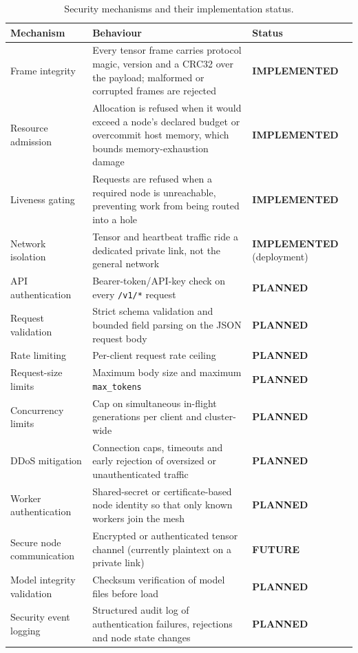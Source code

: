 \documentclass[11pt,a4paper]{article}
\newcommand{\stImp}{\textcolor{ogreen}{\footnotesize\textsf{\textbf{IMPLEMENTED}}}}
\newcommand{\stPlan}{\textcolor{oblue}{\footnotesize\textsf{\textbf{PLANNED}}}}
\newcommand{\stFut}{\textcolor{ored}{\footnotesize\textsf{\textbf{FUTURE}}}}
\begin{document}
\begin{table}[h]
\centering
\caption{Security mechanisms and their implementation status.}
\label{tab:sec}
\footnotesize
\begin{tabularx}{\textwidth}{@{}l X l@{}}
\toprule
\textbf{Mechanism} & \textbf{Behaviour} & \textbf{Status} \\
\midrule
Frame integrity & Every tensor frame carries protocol magic, version and a CRC32
  over the payload; malformed or corrupted frames are rejected & \stImp \\
Resource admission & Allocation is refused when it would exceed a node's declared
  budget or overcommit host memory, which bounds memory-exhaustion damage & \stImp \\
Liveness gating & Requests are refused when a required node is unreachable,
  preventing work from being routed into a hole & \stImp \\
Network isolation & Tensor and heartbeat traffic ride a dedicated private link,
  not the general network & \stImp{} (deployment) \\
API authentication & Bearer-token/API-key check on every \texttt{/v1/*} request & \stPlan \\
Request validation & Strict schema validation and bounded field parsing on the
  JSON request body & \stPlan \\
Rate limiting & Per-client request rate ceiling & \stPlan \\
Request-size limits & Maximum body size and maximum \texttt{max\_tokens} & \stPlan \\
Concurrency limits & Cap on simultaneous in-flight generations per client and
  cluster-wide & \stPlan \\
DDoS mitigation & Connection caps, timeouts and early rejection of oversized or
  unauthenticated traffic & \stPlan \\
Worker authentication & Shared-secret or certificate-based node identity so that
  only known workers join the mesh & \stPlan \\
Secure node communication & Encrypted or authenticated tensor channel (currently
  plaintext on a private link) & \stFut \\
Model integrity validation & Checksum verification of model files before load & \stPlan \\
Security event logging & Structured audit log of authentication failures,
  rejections and node state changes & \stPlan \\
\bottomrule
\end{tabularx}
\end{table}
\end{document}
